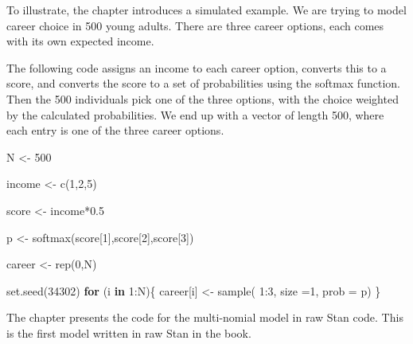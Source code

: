 \documentclass[
]{book}
\newenvironment{Shaded}{\begin{snugshade}}{\end{snugshade}}
\newcommand{\AttributeTok}[1]{\textcolor[rgb]{0.77,0.63,0.00}{#1}}
\newcommand{\ControlFlowTok}[1]{\textcolor[rgb]{0.13,0.29,0.53}{\textbf{#1}}}
\newcommand{\DecValTok}[1]{\textcolor[rgb]{0.00,0.00,0.81}{#1}}
\newcommand{\FloatTok}[1]{\textcolor[rgb]{0.00,0.00,0.81}{#1}}
\newcommand{\FunctionTok}[1]{\textcolor[rgb]{0.00,0.00,0.00}{#1}}
\newcommand{\NormalTok}[1]{#1}
\newcommand{\OtherTok}[1]{\textcolor[rgb]{0.56,0.35,0.01}{#1}}
\newcommand{\SpecialCharTok}[1]{\textcolor[rgb]{0.00,0.00,0.00}{#1}}
\begin{document}
To illustrate, the chapter introduces a simulated example. We are trying to model career choice in 500 young adults. There are three career options, each comes with its own expected income.

The following code assigns an income to each career option, converts this to a score, and converts the score to a set of probabilities using the softmax function. Then the 500 individuals pick one of the three options, with the choice weighted by the calculated probabilities. We end up with a vector of length 500, where each entry is one of the three career options.

\begin{Shaded}
\begin{Highlighting}[]
\NormalTok{N }\OtherTok{\textless{}{-}} \DecValTok{500}

\NormalTok{income }\OtherTok{\textless{}{-}} \FunctionTok{c}\NormalTok{(}\DecValTok{1}\NormalTok{,}\DecValTok{2}\NormalTok{,}\DecValTok{5}\NormalTok{)}

\NormalTok{score }\OtherTok{\textless{}{-}}\NormalTok{ income}\SpecialCharTok{*}\FloatTok{0.5}

\NormalTok{p }\OtherTok{\textless{}{-}} \FunctionTok{softmax}\NormalTok{(score[}\DecValTok{1}\NormalTok{],score[}\DecValTok{2}\NormalTok{],score[}\DecValTok{3}\NormalTok{])}


\NormalTok{career }\OtherTok{\textless{}{-}} \FunctionTok{rep}\NormalTok{(}\DecValTok{0}\NormalTok{,N)}

\FunctionTok{set.seed}\NormalTok{(}\DecValTok{34302}\NormalTok{)}
\ControlFlowTok{for}\NormalTok{ (i }\ControlFlowTok{in} \DecValTok{1}\SpecialCharTok{:}\NormalTok{N)\{}
\NormalTok{  career[i] }\OtherTok{\textless{}{-}} \FunctionTok{sample}\NormalTok{( }\DecValTok{1}\SpecialCharTok{:}\DecValTok{3}\NormalTok{, }\AttributeTok{size =}\DecValTok{1}\NormalTok{, }\AttributeTok{prob =}\NormalTok{ p)}
\NormalTok{\}}
\end{Highlighting}
\end{Shaded}

The chapter presents the code for the multi-nomial model in raw Stan code. This is the first model written in raw Stan in the book.
\end{document}
